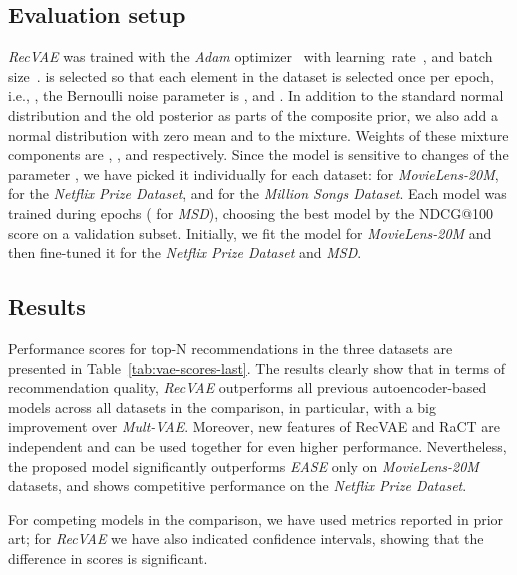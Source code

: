 \documentclass[sigconf,authorversion]{acmart}
\begin{document}
\subsection{Evaluation setup}

\emph{RecVAE} was trained with the \emph{Adam} optimizer~\cite{DBLP:journals/corr/KingmaB14} with learning~rate~, and batch size~.
 is selected so that each element in the dataset is selected once per epoch, i.e., , the Bernoulli noise parameter is , and . In addition to the standard normal distribution and the old posterior as parts of the composite prior, we also add a normal distribution with zero mean and  to the mixture. Weights of these mixture components are , , and  respectively.
Since the model is sensitive to changes of the parameter , we have picked it individually for each dataset:  for \emph{MovieLens-20M},  for the \emph{Netflix Prize Dataset}, and  for the \emph{Million Songs Dataset}. Each model was trained during  epochs ( for \emph{MSD}), choosing the best model by the NDCG@100 score on a validation subset. Initially, we fit the model for \emph{MovieLens-20M} and then fine-tuned it for the \emph{Netflix Prize Dataset} and \emph{MSD}.

\subsection{Results}

Performance scores for top-N recommendations in the three datasets are presented in Table~\ref{tab:vae-scores-last}. The results clearly show that in terms of recommendation quality, \emph{RecVAE} outperforms all previous autoencoder-based models across all datasets in the comparison, in particular, with a big improvement over \emph{Mult-VAE}. Moreover, new features of RecVAE and RaCT are independent and can be used together for even higher performance. Nevertheless, the proposed model significantly outperforms \emph{EASE} only on \emph{MovieLens-20M} datasets, and shows competitive performance on the \emph{Netflix Prize Dataset}.

For competing models in the comparison, we have used metrics reported in prior art; for \emph{RecVAE} we have also indicated confidence intervals, showing that the difference in scores is significant.
\end{document}
